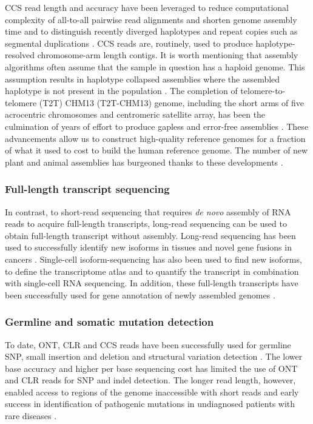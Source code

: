 CCS read length and accuracy have been leveraged to reduce computational complexity of all-to-all pairwise read alignments and shorten genome assembly time \cite{Chin_undated-ye} and to distinguish recently diverged haplotypes and repeat copies such as segmental duplications \cite{Nurk2020-gu, Cheng2021-ij}. CCS reads are, routinely, used to produce haplotype-resolved chromosome-arm length contigs. It is worth mentioning that assembly algorithms often assume that the sample in question has a haploid genome. This assumption results in haplotype collapsed assemblies where the assembled haplotype is not present in the population \cite{Schneider2017-yo}. The completion of telomere-to-telomere (T2T) CHM13 (T2T-CHM13) genome, including the short arms of five acrocentric chromosomes and centromeric satellite array, has been the culmination of years of effort to produce gapless and error-free assemblies \cite{Nurk2022-dv}. These advancements allow us to construct high-quality reference genomes for a fraction of what it used to cost to build the human reference genome. The number of new plant and animal assemblies has burgeoned thanks to these developments \cite{}. 

\subsubsection{Full-length transcript sequencing}

In contrast, to short-read sequencing that requires \textit{de novo} assembly of RNA reads to acquire full-length transcripts, long-read sequencing can be used to obtain full-length transcript without assembly. Long-read sequencing has been used to successfully identify new isoforms in tissues and novel gene fusions in cancers \cite{}. Single-cell isoform-sequencing has also been used to find new isoforms, to define the transcriptome atlas and to quantify the transcript in combination with single-cell RNA sequencing. In addition, these full-length transcripts have been successfully used for gene annotation of newly assembled genomes \cite{}.

\subsubsection{Germline and somatic mutation detection}


To date, ONT, CLR and CCS reads have been successfully used for germline SNP, small insertion and deletion\cite{} and structural variation detection \cite{}. The lower base accuracy and higher per base sequencing cost has limited the use of ONT and CLR reads for SNP and indel detection. The longer read length, however, enabled access to regions of the genome inaccessible with short reads and early success in identification of pathogenic mutations in undiagnosed patients with rare diseases \cite{}.

